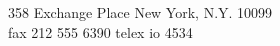\begin{center}
\vspace{25pt}
\small{358 Exchange Place New York, N.Y. 10099\\fax 212 555 6390 telex io 4534}
\end{center}